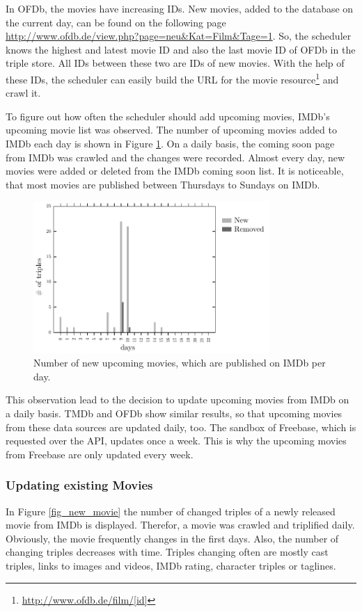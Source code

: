 In OFDb, the movies have increasing IDs.
New movies, added to the database on the current day, can be found on the following page \url{http://www.ofdb.de/view.php?page=neu&Kat=Film&Tage=1}.
So, the scheduler knows the highest and latest movie ID and also the last movie ID of OFDb in the triple store.
All IDs between these two are IDs of new movies.
With the help of these IDs, the scheduler can easily build the URL for the movie resource\footnote{\url{http://www.ofdb.de/film/[id]}} and crawl it.

To figure out how often the scheduler should add upcoming movies, IMDb's upcoming movie list was observed.
The number of upcoming movies added to IMDb each day is shown in Figure \ref{fig_coming_soon_movie}.
On a daily basis, the coming soon page from IMDb was crawled and the changes were recorded.
Almost every day, new movies were added or deleted from the IMDb coming soon list.
It is noticeable, that most movies are published between Thursdays to Sundays on IMDb.

\begin{figure}[h!]
  \begin{center}
  \includegraphics[width=0.8\textwidth]{images/updating_1.pdf}
  \end{center}
  \caption{Number of new upcoming movies, which are published on IMDb per day.}
  \label{fig_coming_soon_movie}
\end{figure}

This observation lead to the decision to update upcoming movies from IMDb on a daily basis.
TMDb and OFDb show similar results, so that upcoming movies from these data sources are updated daily, too.
The sandbox of Freebase, which is requested over the API, updates once a week.
This is why the upcoming movies from Freebase are only updated every week.

\subsubsection{Updating existing Movies}
In Figure \ref{fig_new_movie} the number of changed triples of a newly released movie from IMDb is displayed.
Therefor, a movie was crawled and triplified daily.
Obviously, the movie frequently changes in the first days.
Also, the number of changing triples decreases with time.
Triples changing often are mostly cast triples, links to images and videos, IMDb rating, character triples or taglines.


